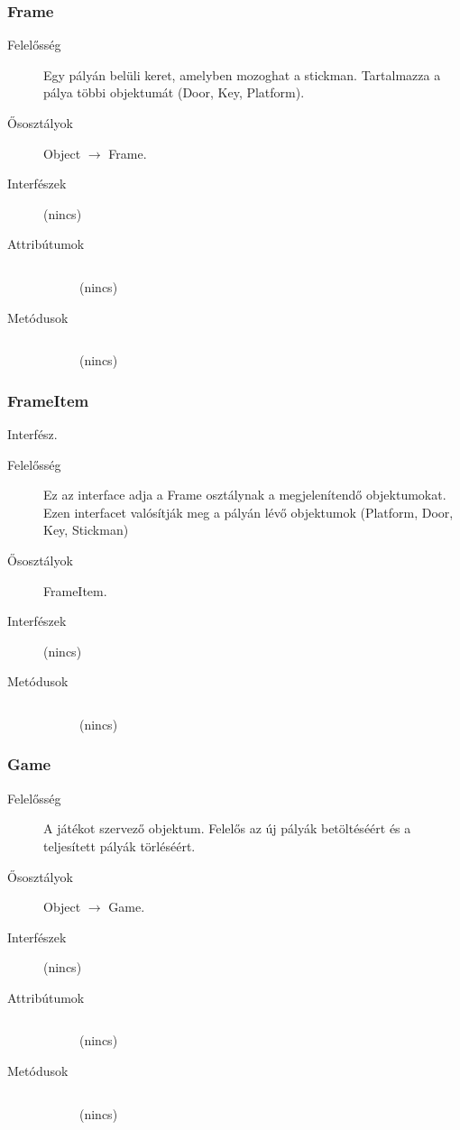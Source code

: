 		\subsubsection{Frame}
		\begin{description}
		\item[Felelősség]
		Egy pályán belüli keret, amelyben mozoghat a stickman. Tartalmazza a pálya többi objektumát (Door, Key, Platform).
		\item[Ősosztályok] Object $\rightarrow{}$ Frame.
		\item[Interfészek] (nincs)
		\item[Attribútumok]$\ $
		\begin{description}
		\item[] (nincs)
		\end{description}
		\item[Metódusok]$\ $
		\begin{description}
		\item[] (nincs)
		\end{description}
		\end{description}
		
		\subsubsection{FrameItem}
		Interfész.
		\begin{description}
		\item[Felelősség]
		Ez az interface adja a Frame osztálynak a megjelenítendő objektumokat.  Ezen interfacet valósítják meg a pályán lévő objektumok (Platform, Door, Key, Stickman)
		\item[Ősosztályok] FrameItem.
		\item[Interfészek] (nincs)
		\item[Metódusok]$\ $
		\begin{description}
		\item[] (nincs)
		\end{description}
		\end{description}
		
		\subsubsection{Game}
		\begin{description}
		\item[Felelősség]
		A játékot szervező objektum. Felelős az új pályák betöltéséért és a teljesített pályák törléséért.
		\item[Ősosztályok] Object $\rightarrow{}$ Game.
		\item[Interfészek] (nincs)
		\item[Attribútumok]$\ $
		\begin{description}
		\item[] (nincs)
		\end{description}
		\item[Metódusok]$\ $
		\begin{description}
		\item[] (nincs)
		\end{description}
		\end{description}
		
